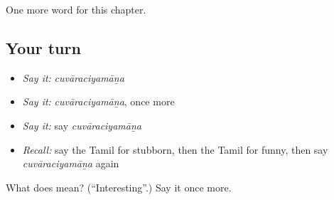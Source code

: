 \begin{grammarlens}[title={What you've built}]
One more word for this chapter.
\end{grammarlens}

\subsection*{Your turn}
\begin{itemize}
\raggedright
  \item \emph{Say it:} \emph{cuvāraciyamāṉa}
  \item \emph{Say it:} \emph{cuvāraciyamāṉa}, once more
  \item \emph{Say it:} say \emph{cuvāraciyamāṉa}
  \item \emph{Recall:} say the Tamil for stubborn, then the Tamil for funny, then say \emph{cuvāraciyamāṉa} again
\end{itemize}

\begin{tcolorbox}[breakable,colback=teal!4,colframe=teal!35!black,title={Before you move on}]
What does  mean? (\textquotedblleft{}Interesting\textquotedblright{}.) Say it once more.
\end{tcolorbox}
